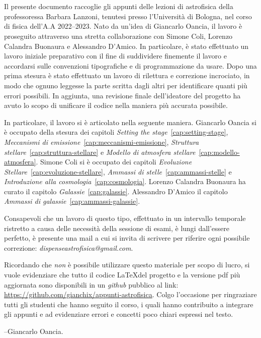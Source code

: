 {\noindent \bfseries \Huge \prefacename}
            \thispagestyle{plain}
            \\
            \\
Il presente documento raccoglie gli appunti delle lezioni di astrofisica della professoressa Barbara Lanzoni, tenutesi presso l'Università di Bologna, nel corso di fisica dell'A.A 2022--2023. Nato da un'idea di Giancarlo Oancia, il lavoro è proseguito attraverso una stretta collaborazione con Simone Coli, Lorenzo Calandra Buonaura e Alessandro D'Amico. In particolare, è stato effettuato un lavoro iniziale preparativo con il fine di suddividere finemente il lavoro e accordarsi sulle convenzioni tipografiche e di programmazione da usare. Dopo una prima stesura è stato effettuato un lavoro di rilettura e correzione incrociato, in modo che ognuno leggesse la parte scritta dagli altri per identificare quanti più errori possibili. In aggiunta, una revisione finale dell'ideatore del progetto ha avuto lo scopo di unificare il codice nella maniera più accurata possibile.

In particolare, il lavoro si è articolato nella seguente maniera. Giancarlo Oancia si è occupato della stesura dei capitoli \emph{Setting the stage}~\ref{cap:setting-stage}, \emph{Meccanismi di emissione}~\ref{cap:meccanismi-emissione}, \emph{Struttura stellare}~\ref{cap:struttura-stellare} e \emph{Modello di atmosfera stellare}~\ref{cap:modello-atmosfera}. Simone Coli si è occupato dei capitoli \emph{Evoluzione Stellare}~\ref{cap:evoluzione-stellare}, \emph{Ammassi di stelle}~\ref{cap:ammassi-stelle} e \emph{Introduzione alla cosmologia}~\ref{cap:cosmologia}. Lorenzo Calandra Buonaura ha curato il capitolo \emph{Galassie}~\ref{cap:galassie}. Alessandro D'Amico il capitolo \emph{Ammassi di galassie}~\ref{cap:ammassi-galassie}.

Consapevoli che un lavoro di questo tipo, effettuato in un intervallo temporale ristretto a causa delle necessità della sessione di esami, è lungi dall'essere perfetto, è presente una mail a cui si invita di scrivere per riferire ogni possibile correzione: \emph{dispenseastrofisica@gmail.com}.

Ricordando che \emph{non} è possibile utilizzare questo materiale per scopo di lucro, si vuole evidenziare che tutto il codice \LaTeX del progetto e la versione pdf più aggiornata sono disponibili in un \emph{github} pubblico al link: \url{https://github.com/gianchix/appunti-astrofisica}. Colgo l'occasione per ringraziare tutti gli studenti che hanno seguito il corso, i quali hanno contribuito a integrare gli appunti e ad evidenziare errori e concetti poco chiari espressi nel testo.

\begin{flushright}
    --Giancarlo Oancia.
\end{flushright}



    {}
